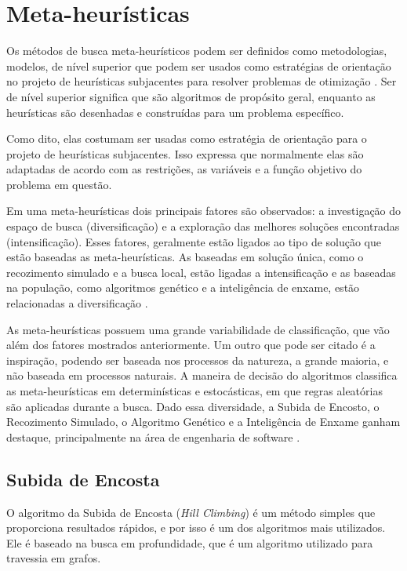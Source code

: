 \section{Meta-heurísticas}

Os métodos de busca meta-heurísticos podem ser definidos como metodologias,
modelos, de nível superior que podem ser usados como estratégias de orientação
no projeto de heurísticas subjacentes para resolver problemas de
otimização \cite{talbi2009metaheuristics}. Ser de nível superior significa que são algoritmos de propósito geral, enquanto as heurísticas são desenhadas e construídas para um problema específico. 

Como dito, elas costumam ser usadas como estratégia de orientação para o projeto de heurísticas subjacentes. Isso expressa que normalmente elas são adaptadas de acordo com as restrições, as variáveis e a função objetivo do problema em questão. 

Em uma meta-heurísticas dois principais fatores são observados: a investigação do espaço de busca (diversificação) e a exploração das melhores soluções encontradas (intensificação). Esses fatores, geralmente estão ligados ao tipo de solução que estão baseadas as meta-heurísticas. As baseadas em solução única, como o recozimento simulado e a busca local, estão ligadas a intensificação e as baseadas na população, como algoritmos genético e a inteligência de enxame, estão relacionadas a diversificação \cite{talbi2009metaheuristics}.

As meta-heurísticas possuem uma grande variabilidade de classificação, que vão além dos fatores mostrados anteriormente. Um outro que pode ser citado é a inspiração, podendo ser baseada nos processos da natureza, a grande maioria, e não baseada em processos naturais. A maneira de decisão do algoritmos classifica as meta-heurísticas em determinísticas e estocásticas, em que regras aleatórias são aplicadas durante a busca. Dado essa diversidade, a Subida de Encosto, o Recozimento Simulado, o Algoritmo Genético e a Inteligência de Enxame ganham destaque, principalmente na área de engenharia de software \cite{khari2017extensive}.

\subsection{Subida de Encosta}

O algoritmo da Subida de Encosta (\textit{Hill Climbing}) é um método simples que proporciona resultados rápidos, e por isso é um dos algoritmos mais utilizados. Ele é baseado na busca em profundidade, que é um algoritmo utilizado para travessia em grafos. 

